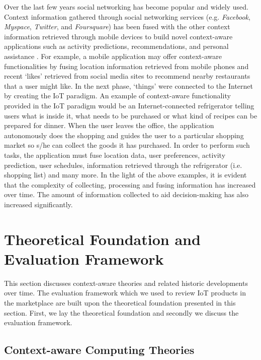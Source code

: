 \documentclass[journal]{IEEEtran}
\begin{document}
Over the last few years social networking \cite{IA01} has become popular and widely used. Context information gathered through social networking services \cite{IA08} (e.g. \textit{Facebook}, \textit{Myspace}, \textit{Twitter}, and \textit{Foursquare}) has been fused with the other context information retrieved through mobile devices to build novel context-aware applications such as activity predictions, recommendations, and personal assistance \cite{NP002}. For example, a mobile application may offer context-aware functionalities by fusing location information retrieved from mobile phones and recent `likes' retrieved from social media sites to recommend nearby restaurants that a user might like. In the next phase, `things' were connected to the Internet by creating the IoT paradigm. An example of context-aware functionality provided in the IoT paradigm would be an Internet-connected refrigerator telling users what is inside it, what needs to be purchased or what kind of recipes can be prepared for dinner. When the user leaves the office, the application autonomously does the shopping and guides the user to a particular shopping market so s/he can collect the goods it has purchased. In order to perform such tasks, the application must fuse location data, user preferences, activity prediction, user schedules, information retrieved through the refrigerator (i.e. shopping list) and many more. In the light of the above examples, it is evident that the complexity of collecting, processing and fusing information has increased over time. The amount of information collected to aid decision-making has also increased significantly. 




 \section{Theoretical Foundation and Evaluation Framework}
 \label{sec:Theory}
 
 This section discusses context-aware theories and related historic developments over time. The evaluation framework which we used to review IoT products in the marketplace are built upon the theoretical foundation presented in this section. First, we lay the theoretical foundation and secondly we discuss the evaluation framework.
 

 \subsection{Context-aware Computing Theories}
 
\end{document}
